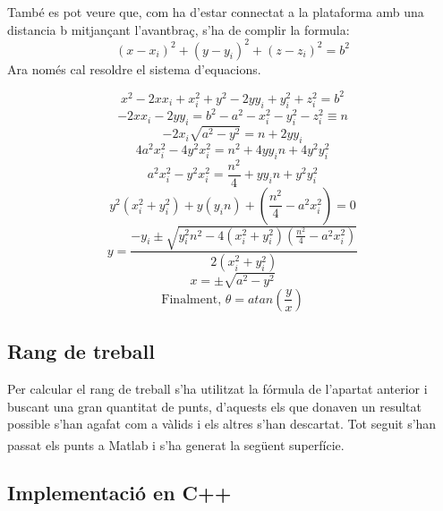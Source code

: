 També es pot veure que, com ha d'estar connectat a la plataforma amb una distancia b mitjançant l'avantbraç, s'ha de complir la formula: \[(x-x_i)^2+(y-y_i)^2+(z-z_i)^2=b^2\]
Ara només cal resoldre el sistema d'equacions.

\[x^2-2xx_i+x_i^2+y^2-2yy_i+y_i^2+z_i^2=b^2\]
\[-2xx_i-2yy_i=b^2-a^2-x_i^2-y_i^2-z_i^2\equiv n\]
\[-2x_i\sqrt{a^2-y^2}=n+2yy_i\]
\[4a^2x_i^2-4y^2x_i^2=n^2+4yy_in+4y^2y_i^2\]
\[a^2x_i^2-y^2x_i^2=\frac{n^2}{4}+yy_in+y^2y_i^2\]
\[y^2(x_i^2+y_i^2)+y(y_in)+(\frac{n^2}{4}-a^2x_i^2)=0\]
\[y=\frac{-y_i\pm\sqrt{y_i^2n^2-4(x_i^2+y_i^2)(\frac{n^2}{4}-a^2x_i^2)}}{2(x_i^2+y_i^2)}\]
\[x=\pm\sqrt{a^2-y^2}\]
\[\textrm{Finalment, }\theta=atan(\frac{y}{x})\]

\subsection{Rang de treball}

Per calcular el rang de treball s'ha utilitzat la fórmula de l'apartat anterior i buscant una gran quantitat de punts, d'aquests els que donaven un resultat possible s'han agafat com a vàlids i els altres s'han descartat. Tot seguit s'han passat els punts a Matlab\textsuperscript{\textregistered} i s'ha generat la següent superfície.



\subsection{Implementació en C++}